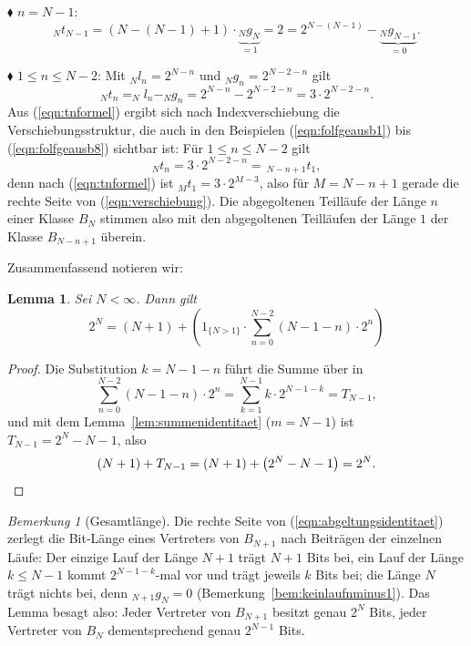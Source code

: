 \documentclass[11pt,a4paper]{scrartcl}
\theoremstyle{plain}
\newtheorem{lemma}[satz]{Lemma}
\theoremstyle{definition}
\theoremstyle{remark}
\newtheorem{bem}[satz]{Bemerkung}
\begin{document}
\noindent$\blacklozenge$ $n=N-1$:
\begin{equation}
  _Nt_{N-1}=\left(N-(N-1)+1\right)\cdot\underbrace{_Ng_N}_{=1}=2
  =2^{N-(N-1)}-\underbrace{_Ng_{N-1}}_{=0}.
\end{equation}

\noindent$\blacklozenge$ $1\leq n\leq N-2$: Mit $_Nl_n=2^{N-n}$ und
$_Ng_n=2^{N-2-n}$ gilt
\begin{equation}\label{eqn:tnformel}
  _Nt_n=_Nl_n-_Ng_n=2^{N-n}-2^{N-2-n}=3\cdot 2^{N-2-n}.
\end{equation}
Aus (\ref{eqn:tnformel}) ergibt sich nach Indexverschiebung die
Verschiebungsstruktur, die auch in den Beispielen
(\ref{eqn:folfgeausb1}) bis (\ref{eqn:folfgeausb8}) sichtbar ist: Für
$1\leq n\leq N-2$ gilt
\begin{equation}\label{eqn:verschiebung}
  _Nt_n=3\cdot 2^{N-2-n}=\,_{N-n+1}t_1,
\end{equation}
denn nach (\ref{eqn:tnformel}) ist $_Mt_1=3\cdot 2^{M-3}$, also für
$M=N-n+1$ gerade die rechte Seite von (\ref{eqn:verschiebung}). Die
abgegoltenen Teilläufe der Länge $n$ einer Klasse $B_N$ stimmen also
mit den abgegoltenen Teilläufen der Länge $1$ der Klasse $B_{N-n+1}$
überein.

Zusammenfassend notieren wir:

\begin{lemma}\label{lem:abgeltungsidentitaet}
Sei $N<\infty$. Dann gilt
\begin{equation}\label{eqn:abgeltungsidentitaet}
  2^{N} = \left(N+1\right)+\left( 1_{\{N>1\}}\cdot\sum_{n=0}^{N-2} (N-1-n) \cdot 2^n\right)
\end{equation}
\end{lemma}

\begin{proof}
Die Substitution $k=N-1-n$ führt die Summe über in
\begin{equation*}
  \sum_{n=0}^{N-2}\left(N-1-n\right)\cdot 2^{n}
  =\sum_{k=1}^{N-1}k\cdot 2^{N-1-k}=T_{N-1},
\end{equation*}
und mit dem Lemma~\ref{lem:summenidentitaet} ($m=N-1$) ist
$T_{N-1}=2^{N}-N-1$, also
\begin{equation*}
  \left(N+1\right)+T_{N-1}
  =\left(N+1\right)+\left(2^{N}-N-1\right)=2^{N}.\qedhere
\end{equation*}
\end{proof}

\begin{bem}[Gesamtlänge]\label{bem:gesamtlaenge}
Die rechte Seite von (\ref{eqn:abgeltungsidentitaet}) zerlegt die
Bit-Länge eines Vertreters von $B_{N+1}$ nach Beiträgen der einzelnen
Läufe: Der einzige Lauf der Länge $N+1$ trägt $N+1$ Bits bei, ein Lauf
der Länge $k\leq N-1$ kommt $2^{N-1-k}$-mal vor und trägt jeweils $k$
Bits bei; die Länge $N$ trägt nichts bei, denn $_{N+1}g_N=0$
(Bemerkung~\ref{bem:keinlaufnminus1}). Das Lemma besagt also: Jeder
Vertreter von $B_{N+1}$ besitzt genau $2^{N}$ Bits, jeder Vertreter von
$B_N$ dementsprechend genau $2^{N-1}$ Bits.
\end{bem}
\end{document}
